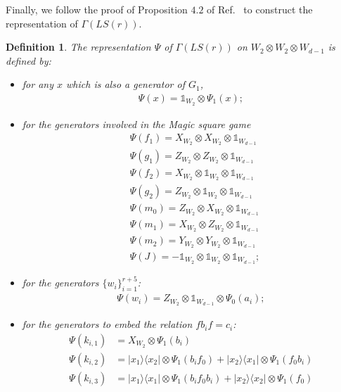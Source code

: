 \documentclass[11pt,letterpaper]{article}
\newcommand{\ketbra}[2]{|#1\rangle\langle#2|}
\newcommand{\x}{\otimes}
\newcommand{\1}{\mathbb{1}}
\newcommand{\LS}{LS}
\newtheorem{definition}[theorem]{Definition}
\theoremstyle{definition}
\begin{document}
Finally, we follow the proof of Proposition $4.2$ of Ref.~\cite{slofstra2017} to construct the 
representation of $\Gamma(\LS(r))$.
\begin{definition}
\label{def:rep_gamma}
The representation $\Psi$ of $\Gamma(\LS(r))$ on $W_2 \x W_2 \x W_{d-1}$ is defined by:
\begin{itemize}
\item for any $x$ which is also a generator of $G_1$,
\begin{align*}
	\Psi(x) = \1_{W_2} \x \Psi_1(x);
\end{align*}
\item for the generators involved in the Magic square game
\begin{align*}
	&\Psi(f_1) = X_{W_2} \x X_{W_2} \x \1_{W_{d-1}} \\
	&\Psi(g_1) = Z_{W_2} \x Z_{W_2} \x \1_{W_{d-1}} \\
	&\Psi(f_2) = X_{W_2} \x \1_{W_2} \x \1_{W_{d-1}} \\
	&\Psi(g_2) = Z_{W_2} \x \1_{W_2} \x \1_{W_{d-1}} \\
	& \Psi(m_0) = Z_{W_2} \x X_{W_2} \x \1_{W_{d-1}}\\
	& \Psi(m_1) = X_{W_2} \x Z_{W_2} \x \1_{W_{d-1}}\\
	& \Psi(m_2) = Y_{W_2} \x Y_{W_2} \x \1_{W_{d-1}}\\
	& \Psi(J) = - \1_{W_2} \x \1_{W_2} \x \1_{W_{d-1}};
\end{align*}
\item for the generators $\{ w_i \}_{i=1}^{r+5}$:
\begin{align*}
	\Psi(w_i) = Z_{W_2} \x \1_{W_{d-1}} \x \Psi_0(a_i);
\end{align*}
\item for the generators to embed the relation $f b_i f = c_i$:
\begin{align*}
	\Psi(k_{i,1}) &= X_{W_2} \x \Psi_1(b_i) \\
	\Psi(k_{i,2}) &= \ketbra{x_1}{x_2} \x \Psi_1(b_if_0) + \ketbra{x_2}{x_1} \x \Psi_1(f_0b_i)\\
	\Psi(k_{i,3}) &= \ketbra{x_1}{x_1} \x \Psi_1(b_if_0b_i) + \ketbra{x_2}{x_2} \x \Psi_1(f_0) \\

\end{align*}
\end{itemize}
\end{definition}
\end{document}
